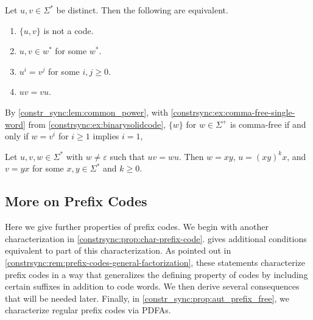 \begin{proposition}
	\label{constr_sync:lem:two-words-code}
	\label{constr_sync:lem:common_power}
	Let $u,v \in \Sigma^*$ be distinct. Then the following are equivalent.
	\begin{enumerate}
		\item $\{u,v\}$ is not a code.
		
		\item $u,v \in w^*$ for some $w^*$.
		
		\item $u^i = v^j$ for some $i,j \ge 0$.
		
		\item $uv = vu$.
	\end{enumerate}	
\end{proposition}

\begin{remark}
	By \cref{constr_sync:lem:common_power}, with \cref{constrsync:ex:comma-free-single-word} from \cref{constrsync:ex:binarysolidcode}, 
	$\{w\}$ for $w \in \Sigma^+$ is comma-free if and only if $w = v^i$ for $i \ge 1$
	implies $i = 1$, 
\end{remark}

\begin{proposition} \label{constrsync:prop:conjugate-words}
	\label{constrsync:lem:schuetz-lyndon}
	Let $u,v,w \in \Sigma^*$
	with $w \ne \varepsilon$ such that $uv = wu$.
	Then $w = xy$, $u = (xy)^kx$, and $v = yx$
	for some $x,y \in \Sigma^*$ and $k \ge 0$.		
\end{proposition}

\subsection{More on Prefix Codes}
\label{constrsync:sec:more-on-prefix-codes}

Here we give further properties of prefix codes. We begin with another characterization in \cref{constrsync:prop:char-prefix-code}.  gives additional conditions equivalent to part of this characterization. As pointed out in \cref{constrsync:rem:prefix-codes-general-factorization}, these statements characterize prefix codes in a way that generalizes the defining property of codes by including certain suffixes in addition to code words. We then derive several consequences that will be needed later. Finally, in \cref{constr_sync:prop:aut_prefix_free}, we characterize regular prefix codes via PDFAs.

